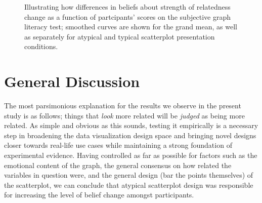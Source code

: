 \documentclass[manuscript,screen,review,anonymous]{acmart}
\begin{document}
\begin{figure}


\caption{\label{fig-emo-smooth}Illustrating how differences in beliefs
about strength of relatedness change as a function of partcipants'
scores on the subjective graph literacy test; smoothed curves are shown
for the grand mean, as well as separately for atypical and typical
scatterplot presentation conditions.}

\end{figure}%

\section{General Discussion}\label{sec-general-discussion}

The most parsimonious explanation for the results we observe in the
present study is as follows; things that \emph{look} more related will
be \emph{judged} as being more related. As simple and obvious as this
sounds, testing it empirically is a necessary step in broadening the
data visualization design space and bringing novel designs closer
towards real-life use cases while maintaining a strong foundation of
experimental evidence. Having controlled as far as possible for factors
such as the emotional content of the graph, the general consensus on how
related the variables in question were, and the general design (bar the
points themselves) of the scatterplot, we can conclude that atypical
scatterplot design was responsible for increasing the level of belief
change amongst participants.
\end{document}
